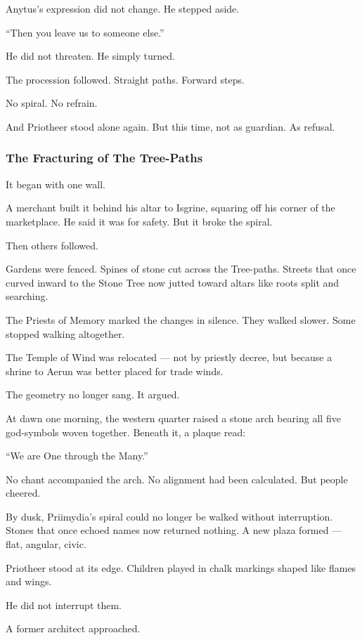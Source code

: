 \documentclass[12pt]{article}
\begin{document}
Anytus’s expression did not change.  
He stepped aside.

 “Then you leave us to someone else.”

He did not threaten.  
He simply turned.

The procession followed.  
Straight paths. Forward steps.

No spiral.  
No refrain.

And Priotheer stood alone again.  
But this time, not as guardian.  
As refusal.


\dotfill

\subsubsection{The Fracturing of The Tree-Paths}

It began with one wall.

A merchant built it behind his altar to Isgrine,  
squaring off his corner of the marketplace.  
He said it was for safety.  
But it broke the spiral.

Then others followed.

Gardens were fenced.  
Spines of stone cut across the Tree-paths.  
Streets that once curved inward to the Stone Tree  
now jutted toward altars like roots split and searching.

The Priests of Memory marked the changes in silence.  
They walked slower.  
Some stopped walking altogether.

The Temple of Wind was relocated — not by priestly decree,  
but because a shrine to Aerun was better placed for trade winds.

The geometry no longer sang.  
It argued.

At dawn one morning, the western quarter raised a stone arch  
bearing all five god-symbols woven together.  
Beneath it, a plaque read:

 “We are One through the Many.”

No chant accompanied the arch.  
No alignment had been calculated.  
But people cheered.

By dusk, Priimydia’s spiral could no longer be walked without interruption.  
Stones that once echoed names now returned nothing.  
A new plaza formed — flat, angular, civic.

Priotheer stood at its edge.  
Children played in chalk markings shaped like flames and wings.

He did not interrupt them.

A former architect approached.
\end{document}
